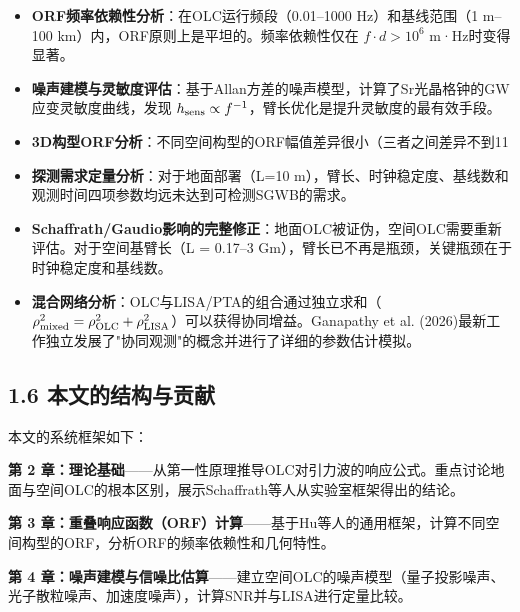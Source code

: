 \documentclass[12pt,a4paper]{article}
\begin{document}
\begin{itemize}
  \item[1] \textbf{ORF频率依赖性分析}：在OLC运行频段（0.01–1000 Hz）和基线范围（1 m–100 km）内，ORF原则上是平坦的。频率依赖性仅在 $f \cdot d > 10^6$ m·Hz时变得显著。

  \item[2] \textbf{噪声建模与灵敏度评估}：基于Allan方差的噪声模型，计算了Sr光晶格钟的GW应变灵敏度曲线，发现 $h_{\rm sens} \propto f^{-1}$，臂长优化是提升灵敏度的最有效手段。

  \item[3] \textbf{3D构型ORF分析}：不同空间构型的ORF幅值差异很小（三者之间差异不到11%

  \item[4] \textbf{探测需求定量分析}：对于地面部署（L=10 m），臂长、时钟稳定度、基线数和观测时间四项参数均远未达到可检测SGWB的需求。

  \item[5] \textbf{Schaffrath/Gaudio影响的完整修正}：地面OLC被证伪，空间OLC需要重新评估。对于空间基臂长（L = 0.17–3 Gm），臂长已不再是瓶颈，关键瓶颈在于时钟稳定度和基线数。

  \item[6] \textbf{混合网络分析}：OLC与LISA/PTA的组合通过独立求和（$\rho_{\rm mixed}^2 = \rho_{\rm OLC}^2 + \rho_{\rm LISA}^2$）可以获得协同增益。Ganapathy et al. (2026)最新工作独立发展了"协同观测"的概念并进行了详细的参数估计模拟\cite{ref11}。

\end{itemize}
\subsection{1.6 本文的结构与贡献}


本文的系统框架如下：

\textbf{第 2 章：理论基础}——从第一性原理推导OLC对引力波的响应公式。重点讨论地面与空间OLC的根本区别，展示Schaffrath等人从实验室框架得出的结论。

\textbf{第 3 章：重叠响应函数（ORF）计算}——基于Hu等人的通用框架，计算不同空间构型的ORF，分析ORF的频率依赖性和几何特性。

\textbf{第 4 章：噪声建模与信噪比估算}——建立空间OLC的噪声模型（量子投影噪声、光子散粒噪声、加速度噪声），计算SNR并与LISA进行定量比较。
\end{document}
